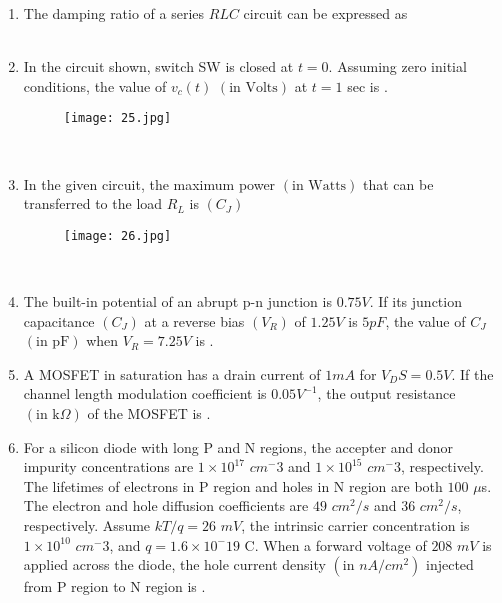 \documentclass[12pt,-letter paper]{article}
\providecommand{\brak}[1]{\ensuremath{\left(#1\right)}}
\theoremstyle{remark}
\begin{document}
\begin{enumerate}
 \item The damping ratio of a series $RLC$ circuit can be expressed as\\ \\

 \item In the circuit shown, switch SW is closed at $t = 0$. Assuming zero initial conditions, the value of $v_c\brak{t}$ \brak{\text{in Volts}} at $
t = 1$ sec is \underline{\hspace{1cm}}.
    \begin{figure}[h]
        \centering
        \texttt{[image: 25.jpg]}
    \end{figure}\\
 \item In the given circuit, the maximum power \brak{\text{in Watts}} that can be transferred to the load $R_L$ is \brak{C_J}
    \begin{figure}[h]
        \centering
        \texttt{[image: 26.jpg]}
    \end{figure}\\
 \item The built-in potential of an abrupt p-n junction is $0.75 V$. If its junction capacitance $\brak{C_J}$ at a reverse bias $\brak{V_R}$ of $1.25 V$ is $5 pF$, the value of $C_J$ \brak{\text{in pF}} when $V_R = 7.25 V$ is \underline{\hspace{1cm}}.

 \item A MOSFET in saturation has a drain current of $1 mA$ for $V_DS = 0.5 V$. If the channel length modulation coefficient is $0.05 V^{-1}$, the output resistance \brak{\text{in k$\Omega$}} of the MOSFET is \underline{\hspace{1cm}}.

 \item For a silicon diode with long P and N regions, the accepter and donor impurity concentrations are $1\times 10^17$ $cm^-3$ and $1 \times 10^15$ $cm^-3$, respectively. The lifetimes of electrons in P region and holes in N 
region are both $100$ $\mu$s. The electron and hole diffusion coefficients are $49$ $cm^2/s$ and $36$ $cm^2/s$, respectively. Assume $kT/q = 26$ $mV$, the intrinsic carrier concentration is $1 \times 10^10$ $cm^-3$, and 
$q = 1.6 \times 10^-19$ C. When a forward voltage of $208$ $mV$ is applied across the diode, the hole current density \brak{\text{in $nA/cm^2$}} injected from P region to N region is \underline{\hspace{2cm}}.


\end{enumerate}
\end{document}
